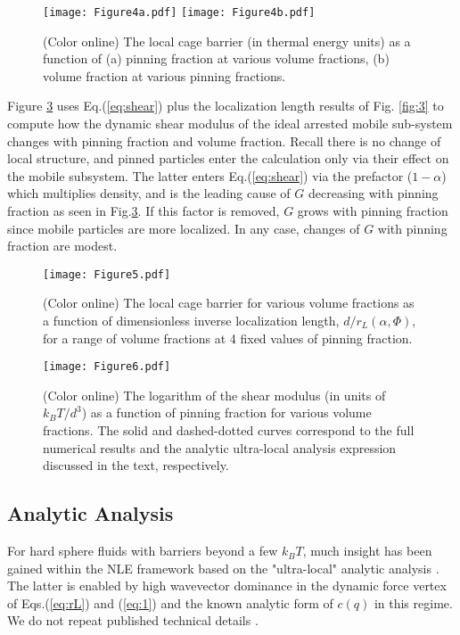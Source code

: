 \documentclass[twocolumn,showpacs,preprintnumbers,amsmath,amssymb,unsortedaddress,
]{revtex4-1}
\begin{document}
\begin{figure}[htp]
\center
\texttt{[image: Figure4a.pdf]}
\texttt{[image: Figure4b.pdf]}
\caption{\label{fig:4}(Color online) The local cage barrier (in thermal energy units) as a function of (a) pinning fraction at various volume fractions, (b) volume fraction at various pinning fractions.}
\end{figure}

Figure \ref{fig:6} uses Eq.(\ref{eq:shear}) plus the localization length results of Fig. \ref{fig:3} to compute how the dynamic shear modulus of the ideal arrested mobile sub-system changes with pinning fraction and volume fraction. Recall there is no change of local structure, and pinned particles enter the calculation only via their effect on the mobile subsystem. The latter enters Eq.(\ref{eq:shear}) via the prefactor ($1-\alpha$) which multiplies density, and  is the leading cause of $G$ decreasing with pinning fraction as seen in Fig.\ref{fig:6}. If this factor is removed, $G$ grows with pinning fraction since mobile particles are more localized. In any case, changes of $G$ with pinning fraction are modest.


\begin{figure}[htp]
\center
\texttt{[image: Figure5.pdf]}
\caption{\label{fig:5}(Color online) The local cage barrier for various volume fractions as a function of dimensionless inverse localization length, $d/r_L(\alpha,\Phi)$, for a range of volume fractions at 4 fixed values of pinning fraction.}
\end{figure}

\begin{figure}[htp]
\center
\texttt{[image: Figure6.pdf]}
\caption{\label{fig:6}(Color online) The logarithm of the shear modulus (in units of $k_BT/d^3$) as a function of pinning fraction for various volume fractions. The solid and dashed-dotted curves correspond to the full numerical results and the analytic ultra-local analysis expression discussed in the text, respectively.}
\end{figure}

\subsection{Analytic Analysis}
For hard sphere fluids with barriers beyond a few $k_BT$, much insight has been gained within the NLE framework based on the "ultra-local" analytic analysis \cite{45}. The latter is enabled by high wavevector dominance in the dynamic force vertex of Eqs.(\ref{eq:rL}) and (\ref{eq:1}) and the known analytic form of $c(q)$ in this regime. We do not repeat published technical details \cite{45}.
\end{document}
